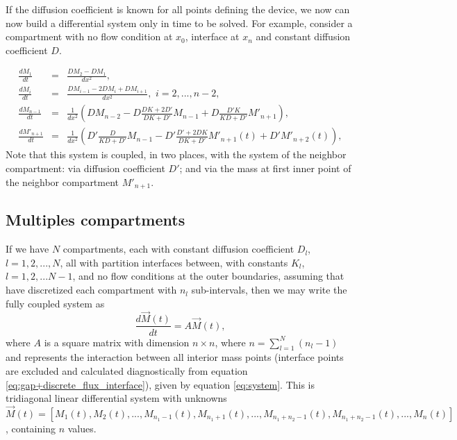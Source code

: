\documentclass[final,1p,times]{elsarticle}
\begin{document}
If the diffusion coefficient is known for all points defining the device, we now can now build a differential system only in time to be solved. For example, consider a compartment with no flow condition at $x_0$, interface at $x_n$ and constant diffusion coefficient $D$.

\begin{eqnarray*}
\frac{d M_{1}}{dt}&=& \frac{DM_{2}-DM_{1} }{dx^2},\\
\frac{d M_{i}}{dt}&=& \frac{DM_{i-1}-2D M_{i} + DM_{i+1}}{dx^2}, \,\, i=2,...,n-2,\\
\frac{d M_{n-1}}{dt}&=& \frac{1}{dx^2}\left(D M_{n-2}-D\frac{DK+2D'}{DK+D'} M_{n-1}  + D\frac{D'K}{KD+D'}M'_{n+1}\right),\\
\frac{d M'_{n+1}}{dt}&=& \frac{1}{dx^2}\left(D'\frac{D}{KD+D'}M_{n-1} -D'\frac{D'+2DK}{DK+D'} M'_{n+1}(t)  + D' M'_{n+2}(t)\right),\label{eq:system}
\end{eqnarray*}
Note that this system is coupled, in two places, with the system of the neighbor compartment: via diffusion coefficient $D'$; and via the mass at first inner point of the neighbor compartment $M'_{n+1}$.

\subsection{Multiples compartments}

If we have $N$ compartments, each with constant diffusion coefficient $D_l$, $l=1,2,...,N$, all with partition interfaces between, with constants $K_l$, $l=1,2,...N-1$, and no flow conditions at the outer boundaries, assuming that have discretized each compartment with $n_l$ sub-intervals, then we may write the fully coupled system as
\begin{equation}
\frac{d \vec{M}(t)}{dt}=A\vec{M}(t),
\end{equation}
where $A$ is a square matrix with dimension $n\times n$, where $n=\sum_{l=1}^{N}(n_l-1)$ and represents the interaction between all interior mass points (interface points are excluded and calculated diagnostically from equation \eqref{eq:gap+discrete_flux_interface}), given by equation \eqref{eq:system}. This is tridiagonal linear differential system with unknowns $\vec{M}(t)=[M_{1}(t), M_{2}(t), ..., M_{n_1-1}(t), M_{n_1+1}(t), ..., M_{n_1+n_2-1}(t), M_{n_1+n_2-1}(t), ..., M_{n}(t)]$, containing $n$ values. 
\end{document}
